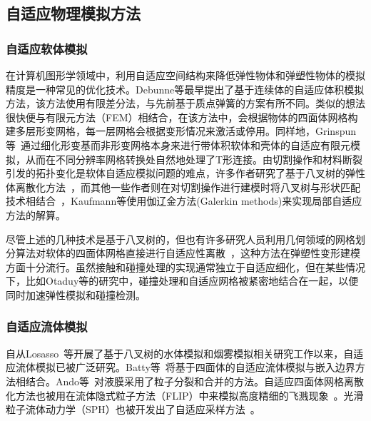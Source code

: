 \subsection{自适应物理模拟方法}
\subsubsection{自适应软体模拟}
在计算机图形学领域中，利用自适应空间结构来降低弹性物体和弹塑性物体的模拟精度是一种常见的优化技术。Debunne等\cite{debunne1999interactive}最早提出了基于连续体的自适应体积模拟方法，该方法使用有限差分法，与先前基于质点弹簧的方案有所不同。类似的想法很快便与有限元方法（FEM）相结合\cite{capell2002multiresolution}，在该方法中，会根据物体的四面体网格构建多层形变网格，每一层网格会根据变形情况来激活或停用。同样地，Grinspun等~\cite{grinspun2002charms}通过细化形变基而非形变网格本身来进行带体积软体和壳体的自适应有限元模拟，从而在不同分辨率网格转换处自然地处理了T形连接。由切割操作和材料断裂引发的拓扑变化是软体自适应模拟问题的难点，许多作者研究了基于八叉树的弹性体离散化方法~\cite{seiler2011robust}，而其他一些作者则在对切割操作进行建模时将八叉树与形状匹配技术相结合~\cite{steinemann2008fast}，Kaufmann等使用伽辽金方法(Galerkin methods)来实现局部自适应方法的解算。

尽管上述的几种技术是基于八叉树的，但也有许多研究人员利用几何领域的网格划分算法对软体的四面体网格直接进行自适应性离散~\cite{labelle2007isosurface}，这种方法在弹塑性变形建模方面十分流行\cite{wicke2010dynamic}。虽然接触和碰撞处理的实现通常独立于自适应细化，但在某些情况下，比如Otaduy等\cite{otaduy2007adaptive}的研究中，碰撞处理和自适应网格被紧密地结合在一起，以便同时加速弹性模拟和碰撞检测。

\subsubsection{自适应流体模拟}
自从Losasso~\cite{losasso2004simulating}等开展了基于八叉树的水体模拟和烟雾模拟相关研究工作以来，自适应流体模拟已被广泛研究。Batty等~\cite{batty2010tetrahedral}将基于四面体的自适应流体模拟与嵌入边界方法相结合。Ando等~\cite{ando2012preserving}对液膜采用了粒子分裂和合并的方法。自适应四面体网格离散化方法也被用在流体隐式粒子方法（FLIP）中来模拟高度精细的飞溅现象~\cite{ando2013highly}。光滑粒子流体动力学（SPH）也被开发出了自适应采样方法~\cite{adams2007adaptively, solenthaler2011two}。

